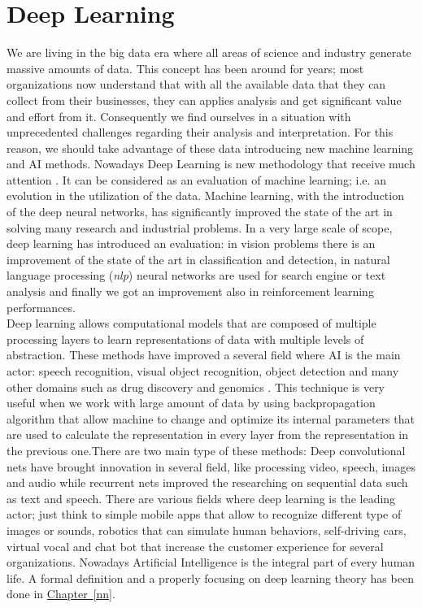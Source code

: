 \documentclass[english, LaM, oneside]{sapthesis}%
\begin{document}
\section{Deep Learning}
We are living in the big data era where all areas of science and industry generate massive amounts of data. This concept has been around for years; most organizations now understand that with all the available data that they can collect from their businesses, they can applies analysis and get significant value and effort from it. Consequently we find ourselves in a situation with unprecedented challenges regarding their analysis and interpretation. For this reason, we should  take advantage of these data introducing new machine learning and AI methods. Nowadays Deep Learning is new methodology that receive much attention \cite{Hinton-2006}. It can be considered as an evaluation of machine learning; i.e. an evolution in the utilization of the data.
\newline \newline
Machine learning, with the introduction of the deep neural networks, has significantly improved the state of the art in solving many research and industrial problems. In a very large scale of scope, deep learning has introduced an evaluation: in vision problems there is an improvement of the state of the art in classification and detection, in natural language processing (\textit{nlp}) neural networks are used for search engine or text analysis and finally we got an improvement also in reinforcement learning performances.
\\
Deep learning allows computational models that are composed of multiple processing layers to learn representations of data with multiple levels of abstraction. These methods have improved a several field where AI is the main actor: speech recognition, visual object recognition, object detection and many other domains such as drug discovery and genomics \cite{deep-learning}. This technique is very useful when we work with large amount of data by using backpropagation algorithm that allow machine to change and optimize its internal parameters that are used to calculate the representation in every layer from the representation in the previous one.There are two main type of these methods:  Deep convolutional nets have brought innovation in several field, like processing video, speech, images and audio while recurrent nets improved the researching on sequential data such as text and speech.
\newline \newline
There are various fields where deep learning is the leading actor; just think to simple mobile apps that allow to recognize different type of images or sounds, robotics that can simulate human behaviors, self-driving cars, virtual vocal and chat bot that increase the customer experience for several organizations. Nowadays Artificial Intelligence is the integral part of every human life.
\newline \newline
A formal definition and a properly focusing on deep learning theory has been done in \hyperref[nn]{Chapter~\ref*{nn}}.
\end{document}
